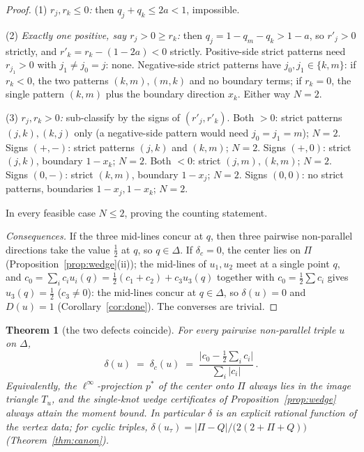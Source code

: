 \documentclass{aims}
\numberwithin{equation}{section}
\theoremstyle{plain}
\newtheorem{theorem}{Theorem}[section]
\theoremstyle{definition}
\theoremstyle{remark}
\begin{document}
\begin{proof}
(1) \emph{$r_j,r_k\le0$:} then $q_j+q_k\le2a<1$, impossible.

(2) \emph{Exactly one positive, say $r_j>0\ge r_k$:} then
$q_j=1-q_m-q_k>1-a$, so $r'_j>0$ strictly, and
$r'_k=r_k-(1-2a)<0$ strictly. Positive-side strict patterns need
$r_{j_1}>0$ with $j_1\ne j_0=j$: none. Negative-side strict patterns have
$j_0,j_1\in\{k,m\}$: if $r_k<0$, the two patterns $(k,m),(m,k)$ and no
boundary terms; if $r_k=0$, the single pattern $(k,m)$ plus the boundary
direction $x_k$. Either way $N=2$.

(3) \emph{$r_j,r_k>0$:} sub-classify by the signs of $(r'_j,r'_k)$. Both
$>0$: strict patterns $(j,k),(k,j)$ only (a negative-side pattern would need
$j_0=j_1=m$); $N=2$. Signs $(+,-)$: strict patterns $(j,k)$ and $(k,m)$;
$N=2$. Signs $(+,0)$: strict $(j,k)$, boundary $1-x_k$; $N=2$. Both $<0$:
strict $(j,m),(k,m)$; $N=2$. Signs $(0,-)$: strict $(k,m)$, boundary
$1-x_j$; $N=2$. Signs $(0,0)$: no strict patterns, boundaries
$1-x_j,1-x_k$; $N=2$.

In every feasible case $N\le2$, proving the counting statement.

\emph{Consequences.} If the three mid-lines concur at $q$, then three
pairwise non-parallel directions take the value $\tfrac12$ at $q$, so
$q\in\Delta$. If $\delta_c=0$, the center lies on $\Pi$
(Proposition~\ref{prop:wedge}(ii)); the mid-lines of $u_1,u_2$ meet at a
single point $q$, and $c_0=\sum_ic_iu_i(q)=\tfrac12(c_1+c_2)+c_3u_3(q)$
together with $c_0=\tfrac12\sum c_i$ gives $u_3(q)=\tfrac12$ ($c_3\ne0$): the
mid-lines concur at $q\in\Delta$, so $\delta(u)=0$ and $D(u)=1$
(Corollary~\ref{cor:done}). The converses are trivial.
\end{proof}

\begin{theorem}[the two defects coincide]\label{thm:deltas}
For every pairwise non-parallel triple $u$ on $\Delta$,
\[
\delta(u)\;=\;\delta_c(u)\;=\;
\frac{\bigl|c_0-\tfrac12\sum_ic_i\bigr|}{\sum_i|c_i|}\,.
\]
Equivalently, the $\ell^\infty$-projection $p^\ast$ of the center onto $\Pi$
always lies in the image triangle $T_u$, and the single-knot wedge
certificates of Proposition~\ref{prop:wedge} always attain the moment bound.
In particular $\delta$ is an explicit rational function of the vertex data;
for cyclic triples, $\delta(u_\tau)=|\Pi-Q|/\bigl(2(2+\Pi+Q)\bigr)$
(Theorem~\ref{thm:canon}).
\end{theorem}
\end{document}
